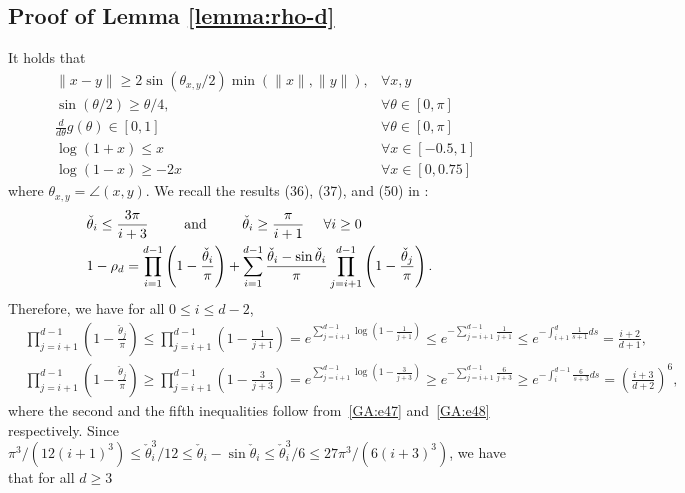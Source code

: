 \subsection{Proof of Lemma \ref{lemma:rho-d}}
It holds that
\begin{align}
&\|x - y\| \geq 2 \sin (\theta_{x, y} / 2) \min(\|x\|, \|y\|), &\forall x, y \label{GA:e4} \\
&\sin(\theta / 2) \geq \theta / 4, &\forall \theta \in [0, \pi] \label{GA:e5} \\
&\frac{d}{d \theta} g(\theta) \in [0, 1] &\forall \theta \in [0, \pi] \label{GA:e13} \\
&\log(1+x) \leq x &\forall x \in [-0.5, 1] \label{GA:e47} \\
&\log(1-x) \geq -2 x &\forall x \in [0, 0.75] \label{GA:e48}
\end{align}
where $\theta_{x, y} = \angle(x, y)$.
We recall the results (36), (37), and (50) in \cite{hand_global_2017}:
\begin{align*}
&\check{\theta}_i \leq \frac{3 \pi}{i + 3}\;\;\;\;\;  \;\;\; \hbox{ and }\;\;\;\;\;  \;\;\; \check{\theta}_i \geq \frac{\pi}{i + 1}\;\;\;\;\; \forall i \geq 0 \\
&1 - \rho_d = \prod_{i = 1}^{d - 1} \left( 1 - \frac{\check{\theta}_{i}}{\pi} \right) + \sum_{i = 1}^{d-1} \frac{\check{\theta}_{i} - \sin \check{\theta}_{i}}{\pi} \prod_{j = i+1}^{d-1} \left( 1 - \frac{\check{\theta}_{j}}{\pi} \right).
\end{align*}
Therefore, we have for all $0 \leq i \leq d - 2$,
\begin{align*}
&\prod_{j = i+1}^{d-1} \left( 1 - \frac{\check{\theta}_{j}}{\pi} \right) 
\leq \prod_{j = i+1}^{d-1} \left( 1 - \frac{1}{j + 1} \right) = e^{\sum_{j = i + 1}^{d - 1} \log\left(1 - \frac{1}{j + 1}\right)} 
\leq e^{- \sum_{j = i + 1}^{d - 1}  \frac{1}{j + 1}} \leq e^{- \int_{i + 1}^d \frac{1}{s + 1} d s} = \frac{i + 2}{d + 1}, \\
%
&\prod_{j = i+1}^{d-1} \left( 1 - \frac{\check{\theta}_{j}}{\pi} \right) 
\geq
\prod_{j = i+1}^{d-1} \left( 1 - \frac{3}{j + 3} \right) = e^{\sum_{j = i + 1}^{d - 1} \log\left(1 - \frac{3}{j + 3}\right)} 
\geq e^{- \sum_{j = i + 1}^{d - 1}  \frac{6}{j + 3}} \geq e^{- \int_{i}^{d - 1} \frac{6}{s + 3} d s} = \left(\frac{i + 3}{d + 2}\right)^6,
\end{align*}
where the second and the fifth inequalities follow from~\eqref{GA:e47} and~\eqref{GA:e48} respectively.
Since $\pi^3 / (12 (i + 1)^3) \leq \check{\theta}_{i}^3 / 12 \leq \check{\theta}_{i} - \sin \check{\theta}_{i} \leq \check{\theta}_{i}^3 / 6 \leq 27 \pi^3 / (6 (i + 3)^3)$, we have that for all $d \geq 3$
